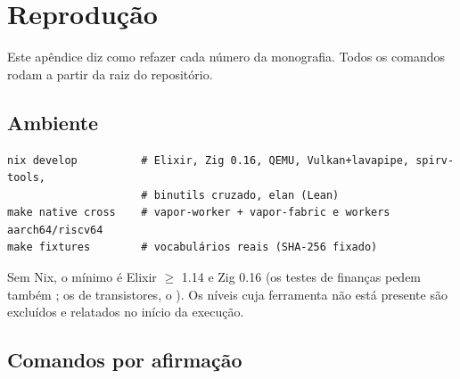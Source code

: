 \chapter{Reprodução}\label{ap:reproducao}

Este apêndice diz como refazer cada número da monografia. Todos os comandos rodam a partir da raiz do repositório.

\section{Ambiente}

\begin{lstlisting}
nix develop          # Elixir, Zig 0.16, QEMU, Vulkan+lavapipe, spirv-tools,
                     # binutils cruzado, elan (Lean)
make native cross    # vapor-worker + vapor-fabric e workers aarch64/riscv64
make fixtures        # vocabulários reais (SHA-256 fixado)
\end{lstlisting}

Sem Nix, o mínimo é Elixir $\geq$ 1.14 e Zig 0.16 (os testes de finanças pedem também ; os de transistores, o ). Os níveis cuja ferramenta não está presente são excluídos e relatados no início da execução.

\section{Comandos por afirmação}

